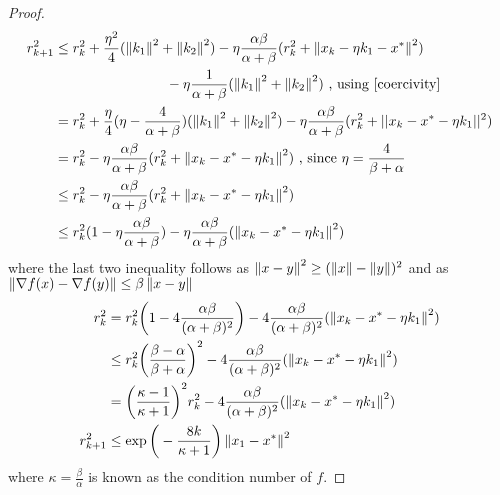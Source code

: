 \begin{proof}
\begin{align*}
r_{k + 1}^{2} & \leq r_{k}^{2} + \frac{\eta^{2}}{4}(\left\lVert k_{1}\right\rVert^{2} + \left\lVert k_{2}\right\rVert^{2}) - \eta \frac{\alpha \beta}{\alpha + \beta}(r^{2}_k + \left\lVert x_{k} - \eta k_{1} - x^{*} \right\rVert^{2})  \\ & \qquad \qquad \qquad \qquad -\eta \frac{1}{\alpha + \beta} (\left\lVert k_{1}\right\rVert^{2} + \left\lVert k_{2}\right\rVert^{2}) \text{    , using \eqref{coercivity}} \\
&= r_{k}^{2} + \frac{\eta}{4} (\eta - \frac{4}{\alpha + \beta})(\left\lVert k_{1}\right\rVert^{2} + \left\lVert k_{2}\right\rVert^{2})  - \eta \frac{\alpha \beta}{\alpha + \beta}(r^{2}_k + || x_{k} - x^{*} - \eta k_{1} ||^{2}) \\
&= r_{k}^{2}  - \eta \frac{\alpha \beta}{\alpha + \beta}(r^{2}_k + \left\lVert x_{k} - x^{*} - \eta k_{1}\right\rVert^{2}) \text{    , since $\eta = \frac{4}{\beta + \alpha}$} \\
& \leq r_{k}^{2} - \eta \frac{\alpha \beta}{\alpha + \beta}(r_{k}^{2} +  \left\lVert x_{k} - x^{*} - \eta k_{1}\right\rVert^{2}) \\
& \leq r_{k}^{2}(1 - \eta \frac{\alpha \beta}{\alpha + \beta})  -  \eta \frac{\alpha \beta}{\alpha + \beta}( \left\lVert x_{k} - x^{*} - \eta k_{1}\right\rVert^{2})
\end{align*}
where the last two inequality follows as $\left\lVert x - y\right\rVert^{2} \geq (\left\lVert x\right\rVert - \left\lVert y\right\rVert)^{2}$ and as $\left\lVert\nabla f(x) - \nabla f(y)\right\rVert \leq \beta \left\lVert x - y\right\rVert$
\begin{align}
r_{k}^{2}&= r_{k}^{2} \bigg(1 - 4  \frac{\alpha \beta}{(\alpha + \beta)^{2}} \bigg) -  4  \frac{\alpha \beta}{(\alpha + \beta)^{2}}( \left\lVert x_{k} - x^{*} - \eta k_{1}\right\rVert^{2})  \\
& \leq r_{k}^{2} \bigg(\frac{\beta - \alpha}{\beta + \alpha}\bigg)^{2} -  4  \frac{\alpha \beta}{(\alpha + \beta)^{2}}( \left\lVert x_{k} - x^{*} - \eta k_{1}\right\rVert^{2})  \\
&= \bigg(\frac{\kappa - 1}{\kappa + 1}\bigg)^{2} r_{k}^{2} -  4  \frac{\alpha \beta}{(\alpha + \beta)^{2}}( \left\lVert x_{k} - x^{*} - \eta k_{1}\right\rVert^{2}) \\
r^{2}_{k + 1} &\leq \exp \bigg(- \frac{8 k}{ \kappa + 1} \bigg) \left\lVert x_{1} - x^{*}\right\rVert^{2}
\end{align}
where $\kappa = \frac{\beta}{\alpha}$ is known as the condition number of $f$.
\end{proof}


